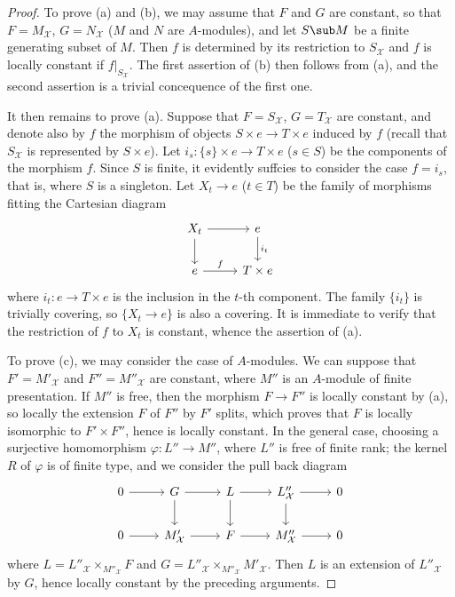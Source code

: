 \begin{proof}
To prove (a) and (b), we may assume that $F$ and $G$ are constant, so that $F=M_\mathcal{X}$, $G=N_\mathcal{X}$ ($M$ and $N$ are $A$-modules), and let $S\sub M$ be a finite generating subset of $M$. Then $f$ is determined by its restriction to $S_\mathcal{X}$ and $f$ is locally constant if $f|_{S_\mathcal{X}}$. The first assertion of (b) then follows from (a), and the second assertion is a trivial concequence of the first one.\par
It then remains to prove (a). Suppose that $F=S_\mathcal{X}$, $G=T_\mathcal{X}$ are constant, and denote also by $f$ the morphism of objects $S\times e\to T\times e$ induced by $f$ (recall that $S_\mathcal{X}$ is represented by $S\times e$). Let $i_s:\{s\}\times e\to T\times e$ ($s\in S$) be the components of the morphism $f$. Since $S$ is finite, it evidently suffcies to consider the case $f=i_s$, that is, where $S$ is a singleton. Let $X_t\to e$ ($t\in T$) be the family of morphisms fitting the Cartesian diagram
\[\begin{tikzcd}
X_t\ar[r]\ar[d]&e\ar[d,"i_t"]\\
e\ar[r,"f"]&T\times e
\end{tikzcd}\]
where $i_t:e\to T\times e$ is the inclusion in the $t$-th component. The family $\{i_t\}$ is trivially covering, so $\{X_t\to e\}$ is also a covering. It is immediate to verify that the restriction of $f$ to $X_t$ is constant, whence the assertion of (a).\par
To prove (c), we may consider the case of $A$-modules. We can suppose that $F'=M'_\mathcal{X}$ and $F''=M''_\mathcal{X}$ are constant, where $M''$ is an $A$-module of finite presentation. If $M''$ is free, then the morphism $F\to F''$ is locally constant by (a), so locally the extension $F$ of $F''$ by $F'$ splits, which proves that $F$ is locally isomorphic to $F'\times F''$, hence is locally constant. In the general case, choosing a surjective homomorphism $\varphi:L''\to M''$, where $L''$ is free of finite rank; the kernel $R$ of $\varphi$ is of finite type, and we consider the pull back diagram
\[\begin{tikzcd}
0\ar[r]&G\ar[r]\ar[d]&L\ar[r]\ar[d]&L''_\mathcal{X}\ar[d]\ar[r]&0\\
0\ar[r]&M'_\mathcal{X}\ar[r]&F\ar[r]&M''_\mathcal{X}\ar[r]&0
\end{tikzcd}\]
where $L=L''_\mathcal{X}\times_{M''_\mathcal{X}}F$ and $G=L''_\mathcal{X}\times_{M''_\mathcal{X}}M'_\mathcal{X}$. Then $L$ is an extension of $L''_\mathcal{X}$ by $G$, hence locally constant by the preceding arguments.
\end{proof}


